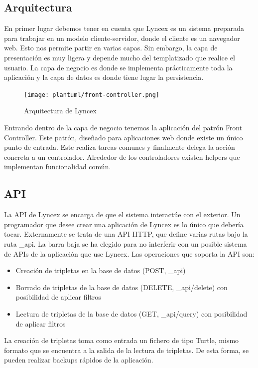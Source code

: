\documentclass[12pt]{report} %
\begin{document}
\subsection{Arquitectura}
En primer lugar debemos tener en cuenta que Lyncex es un sistema preparada para trabajar en un modelo cliente-servidor, donde el cliente es un navegador web. Esto nos permite partir en varias capas. Sin embargo, la capa de presentación es muy ligera y depende mucho del templatizado que realice el usuario. La capa de negocio es donde se implementa prácticamente toda la aplicación y la capa de datos es donde tiene lugar la persistencia.

\begin{figure}
    \centering
    \texttt{[image: plantuml/front-controller.png]}
    \caption{Arquitectura de Lyncex}
    \label{fig:arquitectura}
\end{figure}

Entrando dentro de la capa de negocio tenemos la aplicación del patrón Front Controller.
Este patrón, diseñado para aplicaciones web donde existe un único punto de entrada. Este realiza tareas comunes y finalmente delega la acción concreta a un controlador. Alrededor de los controladores existen helpers que implementan funcionalidad común.

\subsection{API}

La API de Lyncex se encarga de que el sistema interactúe con el exterior.
Un programador que desee crear una aplicación de Lyncex es lo único que debería tocar.
Externamente se trata de una API HTTP, que define varias rutas bajo la ruta \_api. La barra baja se ha elegido para no interferir con un posible sistema de APIs de la aplicación que use Lyncex.
Las operaciones que soporta la API son:
\begin{itemize}
    \item Creación de tripletas en la base de datos (POST, \_api)
    \item Borrado de tripletas de la base de datos (DELETE, \_api/delete) con posibilidad de aplicar filtros
    \item Lectura de tripletas de la base de datos (GET, \_api/query) con posibilidad de aplicar filtros
\end{itemize}

La creación de tripletas toma como entrada un fichero de tipo Turtle, mismo formato que se encuentra a la salida de la lectura de tripletas.
De esta forma, se pueden realizar backups rápidos de la aplicación.
\end{document}
